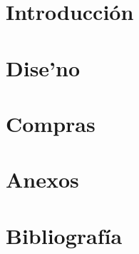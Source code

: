 \documentclass[12pt,oneside,final]{rf2}
\begin{document}





\newpage
{}

\tableofcontents

\listoffigures

\listoftables
\newpage
\startarabicpagination

\part{Introducci\'on}


\part{Dise'no}




%
%
%
%
\part{Compras}



%



\part{Anexos}
\appendix
%
%
%
%
%
%

\part{Bibliograf\'ia}


%


%
\end{document}
